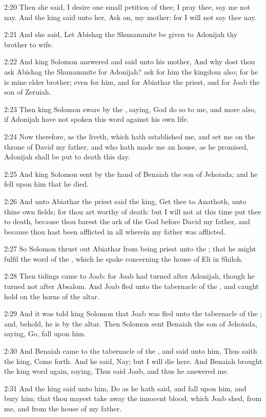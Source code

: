 2:20 Then she said, I desire one small petition of thee; I pray thee, say me not nay. And the king said unto her, Ask on, my mother: for I will not say thee nay.

2:21 And she said, Let Abishag the Shunammite be given to Adonijah thy brother to wife.

2:22 And king Solomon answered and said unto his mother, And why dost thou ask Abishag the Shunammite for Adonijah? ask for him the kingdom also; for he is mine elder brother; even for him, and for Abiathar the priest, and for Joab the son of Zeruiah.

2:23 Then king Solomon sware by the \LORD, saying, God do so to me, and more also, if Adonijah have not spoken this word against his own life.

2:24 Now therefore, as the \LORD liveth, which hath established me, and set me on the throne of David my father, and who hath made me an house, as he promised, Adonijah shall be put to death this day.

2:25 And king Solomon sent by the hand of Benaiah the son of Jehoiada; and he fell upon him that he died.

2:26 And unto Abiathar the priest said the king, Get thee to Anathoth, unto thine own fields; for thou art worthy of death: but I will not at this time put thee to death, because thou barest the ark of the \LORD God before David my father, and because thou hast been afflicted in all wherein my father was afflicted.

2:27 So Solomon thrust out Abiathar from being priest unto the \LORD; that he might fulfil the word of the \LORD, which he spake concerning the house of Eli in Shiloh.

2:28 Then tidings came to Joab: for Joab had turned after Adonijah, though he turned not after Absalom. And Joab fled unto the tabernacle of the \LORD, and caught hold on the horns of the altar.

2:29 And it was told king Solomon that Joab was fled unto the tabernacle of the \LORD; and, behold, he is by the altar. Then Solomon sent Benaiah the son of Jehoiada, saying, Go, fall upon him.

2:30 And Benaiah came to the tabernacle of the \LORD, and said unto him, Thus saith the king, Come forth. And he said, Nay; but I will die here. And Benaiah brought the king word again, saying, Thus said Joab, and thus he answered me.

2:31 And the king said unto him, Do as he hath said, and fall upon him, and bury him; that thou mayest take away the innocent blood, which Joab shed, from me, and from the house of my father.

